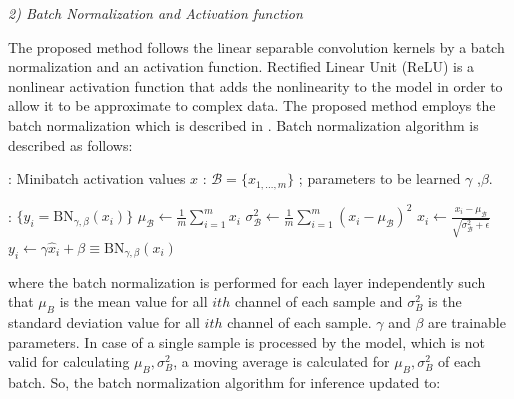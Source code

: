 \textit{2)  Batch Normalization and  Activation function}

The proposed method follows the linear separable convolution kernels by a batch normalization and an activation function. Rectified Linear Unit (ReLU) is a nonlinear activation  function that adds the nonlinearity to the model in order to allow it to be approximate to complex data. The proposed method employs the batch normalization which is described in \cite{batchnorm}. Batch normalization algorithm is described as follows:



\vspace*{1.3\baselineskip}
\begin{algorithmic}[1]

\REQUIRE : Minibatch activation values $x$ : $\mathcal B = \{x_{1,\ldots,m}\}$ ; parameters to be learned $\gamma$ ,$\beta$.

\ENSURE  : $\{y_i = \mathrm{BN}_{\gamma,\beta}(x_i)\}$
\vspace*{.7\baselineskip}
\STATE $\mu_{\mathcal B} \leftarrow \frac1m \sum_{i = 1}^m x_i$
\vspace*{.7\baselineskip}
\STATE $\sigma^2_{\mathcal B} \leftarrow \frac1m \sum_{i=1}^m (x_i - \mu_{\mathcal B})^2$
\vspace*{.7\baselineskip}
\STATE $\hat x_i \leftarrow \frac{x_i - \mu_{\mathcal B}}{\sqrt{\sigma_{\mathcal B}^2 + \epsilon}}$
\vspace*{.7\baselineskip}
\STATE $y_i \leftarrow \gamma \hat x_i + \beta \equiv \mathrm{BN}_{\gamma,\beta}(x_i)$

\end{algorithmic}


where the batch normalization is performed for each layer independently such that $\mu_B$ is the mean value for all $ith$ channel of each sample and $\sigma_B^2$ is the standard deviation value for all $ith$ channel of each sample. $\gamma$ and $\beta$ are  trainable parameters.  In case of a single sample is processed by the model, which is not valid for calculating $\mu_B, \sigma_B^2$, a moving average is calculated for $\mu_B, \sigma_B^2$ of each batch. So, the batch normalization algorithm for inference updated to:



